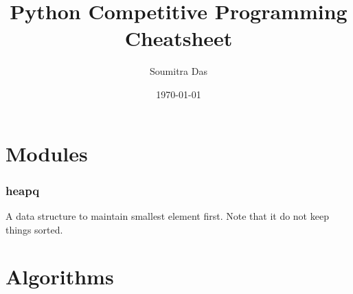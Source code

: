 \documentclass[8pt, a4paper, twocolumn]{article}
\title{Python Competitive Programming Cheatsheet}
\author{Soumitra Das}
\date{\today}
\begin{document}
\maketitle

\section*{Modules}
\subsubsection*{heapq}
A data structure to maintain smallest element first. Note that it do not keep things sorted.

\section*{Algorithms}
\end{document}
